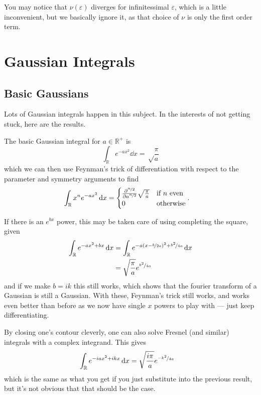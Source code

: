 \documentclass[]{scrreprt}
\begin{document}
You may notice that \( \nu(\varepsilon) \) diverges for infinitessimal \(\varepsilon \), which is a little inconvenient, but we basically ignore it, as that choice of \(\nu\) is only the first order term.


\appendix
\chapter{Gaussian Integrals}
\section{Basic Gaussians}
Lots of Gaussian integrals happen in this subject. In the interests of not getting stuck, here are the results.

The basic Gaussian integral for \( a \in \mathbb{R}^+\) is
\[ \int_\mathbb{R} e^{-ax^2} \dd{x} = \sqrt\frac{\pi}{a} \] which we can then use Feynman's trick of differentiation with respect to the parameter and symmetry arguments to find
\begin{align*}
  \int_\mathbb{R} x^n e^{-ax^2} \dd{x} &= \begin{cases}
    \pdv[\nicefrac{n}{2}]{a} \sqrt\frac{\pi}{a} & \text{if \(n\) even}\\
    0 & \text{otherwise}
  \end{cases}.
\end{align*}

If there is an \(e^{bx} \) power, this may be taken care of using completing the square, given
\begin{align*}
  \int_\mathbb{R} e^{-ax^2+bx} \dd{x} &= \int_\mathbb{R} e^{-a(x - \nicefrac{b}{2a})^2+\nicefrac{b^2}{4a}} \dd{x}\\
  &= \sqrt\frac{\pi}{a} e^{\nicefrac{b^2}{4a}}
\end{align*}
and if we make \(b = ik\) this still works, which shows that the fourier transform of a Gaussian is still a Gaussian.
With these, Feynman's trick still works, and works even better than before as we now have single \(x\) powers to play with --- just keep differentiating.

By closing one's contour cleverly, one can also solve Fresnel (and similar) integrals with a complex integrand. This gives
\begin{align*}
  \int_\mathbb{R} e^{-iax^2+ikx} \dd{x}
  &= \sqrt\frac{i\pi}{a} e^{\nicefrac{-k^2}{4a}}
\end{align*}
which is the same as what you get if you just substitute into the previous result, but it's not obvious that that should be the case.
\end{document}
